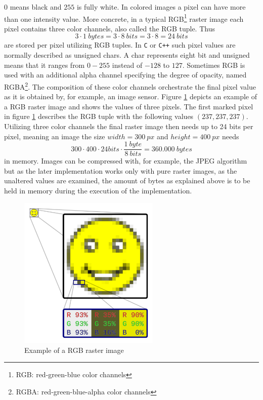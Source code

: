 $0$ means black and $255$ is fully white.
In colored images a pixel can have more than one intensity value.
More concrete, in a typical RGB\footnote{RGB: red-green-blue color channels} raster image each pixel contains three color channels, also called the RGB tuple.
Thus $$3 \cdot 1\ bytes = 3 \cdot 8\ bits = 3 \cdot 8 = 24\ bits$$ are stored per pixel utilizing RGB tuples.
In \texttt{C} or \texttt{C++} such pixel values are normally described as unsigned chars. A char represents eight bit and unsigned means that it ranges from $0 - 255$ instead of $-128$ to $127$.
Sometimes RGB is used with an additional alpha channel specifying the degree of opacity, named RGBA\footnote{RGBA: red-green-blue-alpha color channels}.
The composition of these color channels orchestrate the final pixel value as it is obtained by, for example, an image sensor.
Figure \ref{fig:rgb-raster-image} depicts an example of a RGB raster image and shows the values of three pixels.
The first marked pixel in figure \ref{fig:rgb-raster-image} describes the RGB tuple with the following values $(237,237,237)$.
Utilizing three color channels the final raster image then needs up to 24 bits per pixel, meaning an image the size $width = 300\ px$ and $height = 400\ px$ needs $$300 \cdot 400 \cdot 24bits \cdot \frac{1\ byte}{8\ bits} = 360.000\ bytes$$ in memory.
Images can be compressed with, for example, the JPEG algorithm but as the later implementation works only with pure raster images, as the unaltered values are examined, the amount of bytes as explained above is to be held in memory during the execution of the implementation.

\begin{figure}[h!]
  \centering
  \includegraphics[width=0.6\textwidth]{src/images/rgb-raster-image.png}
  \caption[Example of an RGB raster image]{Example of a RGB raster image\protect\footnotemark}
  \label{fig:rgb-raster-image}
\end{figure}


